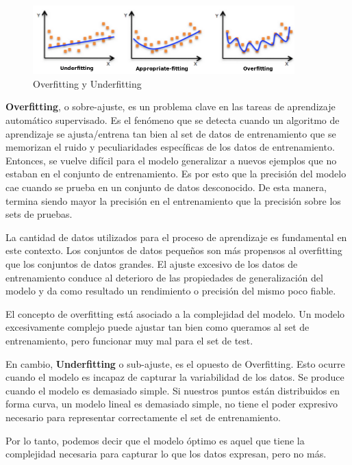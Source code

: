 \documentclass[12pt,a4paper]{article}
\begin{document}
\begin{sloppypar}
\begin{figure}[H]    %
 \centering
 \includegraphics[width=0.9\textwidth]{images/Fitting.png}
 \caption{Overfitting y Underfitting\cite{apunte_uba}}
 \label{fig:fitting}
\end{figure}

\textbf{Overfitting}, o sobre-ajuste, es un problema clave en las tareas de aprendizaje automático supervisado.
Es el fenómeno que se detecta cuando un algoritmo de aprendizaje se ajusta/entrena tan bien al set de datos de entrenamiento que se memorizan el ruido y peculiaridades específicas de los datos de entrenamiento. Entonces, se vuelve difícil para el modelo generalizar a nuevos ejemplos que no estaban en el conjunto de entrenamiento. Es por esto que la precisión del modelo cae cuando se prueba en un conjunto de datos desconocido. De esta manera, termina siendo mayor la precisión en el entrenamiento que la precisión sobre los sets de pruebas.

La cantidad de datos utilizados para el proceso de aprendizaje es fundamental en este contexto. Los conjuntos de datos pequeños son más propensos al overfitting que los conjuntos de datos grandes. El ajuste excesivo de los datos de entrenamiento conduce al deterioro de las propiedades de generalización del modelo y da como resultado un rendimiento o precisión del mismo poco fiable\cite{over_and_under}.

El concepto de overfitting está asociado a la complejidad del modelo. Un modelo excesivamente complejo puede ajustar tan bien como queramos al set de entrenamiento, pero funcionar muy mal para el set de test\cite{apunte_uba}.

En cambio, \textbf{Underfitting} o sub-ajuste, es el opuesto de Overfitting. Esto ocurre cuando el modelo es incapaz de capturar la variabilidad de los datos. Se produce cuando el modelo es demasiado simple. Si nuestros puntos están distribuidos en forma curva, un modelo lineal es demasiado simple, no tiene el poder expresivo necesario para representar correctamente el set de entrenamiento\cite{apunte_uba}.

Por lo tanto, podemos decir que el modelo óptimo es aquel que tiene la complejidad necesaria para capturar lo que los datos expresan, pero no más.


\end{sloppypar}
\end{document}

